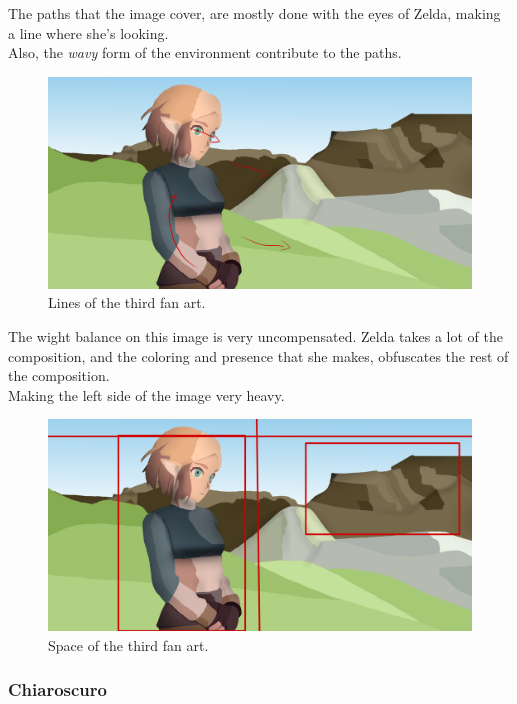 \documentclass{cup-pan}
\begin{document}
            The paths that the image cover, are mostly done with the eyes of Zelda, making a line where she's looking.\\
            Also, the \textit{wavy} form of the environment contribute to the paths. 
            \begin{figure}[H]
                \includegraphics[width=\textwidth]{Fanart3/0_Analisi/recorridos.png}
                \caption{Lines of the third fan art.}
            \end{figure}

            The wight balance on this image is very uncompensated. Zelda takes a lot of the composition, and the coloring and presence that she makes, obfuscates the rest of the composition.\\
            Making the left side of the image very heavy. 
            \begin{figure}[H]
                \includegraphics[width=\textwidth]{Fanart3/0_Analisi/balanza.png}
                \caption{Space of the third fan art.}
            \end{figure}

        \subsubsection{Chiaroscuro}
\end{document}
